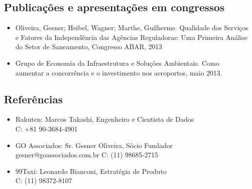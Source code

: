 \documentclass{article}
\begin{document}
\begin{multicols}{2}
\columnbreak

\subsection{Publicações e apresentações em congressos}
\begin{itemize}
\item{Oliveira, Gesner; Heibel, Wagner; Marthe, Guilherme. Qualidade dos Serviços e Fatores da Independência das Agências Reguladoras: Uma Primeira Análise do Setor de Saneamento, Congresso ABAR, 2013} 
\item{Grupo de Economia da Infraestrutura e Soluções Ambientais. Como aumentar a concorrência e o investimento nos aeroportos, maio 2013.}
\end{itemize} 


\subsection{Referências}
\begin{itemize}
\item{Rakuten: Marcos Takashi, Engenheiro e Cientista de Dados \\C: +81 90-3684-4901} 
\item{GO Associados: Sr. Gesner Oliveira, Sócio Fundador\\gesner@goassociados.com.br C: (11) 98685-2715} 
\item{99Taxi: Leonardo Bianconi, Estratégia de Produto\\ C: (11) 98372-8107}
\end{itemize}

\end{multicols}
\end{document}

